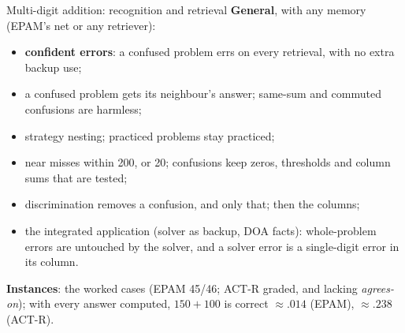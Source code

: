 \documentclass[aspectratio=169,11pt]{beamer}
\begin{document}
\begin{frame}{Multi-digit addition: recognition and retrieval}
  \small
  \textbf{General}, with any memory (EPAM's net or any retriever):
  \begin{itemize}
    \item \textbf{confident errors}: a confused problem errs on every retrieval, with no extra backup use;
    \item a confused problem gets its neighbour's answer; same-sum and commuted confusions are harmless;
    \item strategy nesting; practiced problems stay practiced;
    \item near misses within 200, or 20; confusions keep zeros, thresholds and column sums that are tested;
    \item discrimination removes a confusion, and only that; then the columns;
    \item the integrated application (solver as backup, DOA facts): whole-problem errors are untouched by the solver, and a solver error is a single-digit error in its column.
  \end{itemize}
  \textbf{Instances}: the worked cases (EPAM 45/46; ACT-R graded, and lacking \emph{agrees-on}); with every answer computed, $150+100$ is correct $\approx .014$ (EPAM), $\approx .238$ (ACT-R).
\end{frame}
\end{document}
